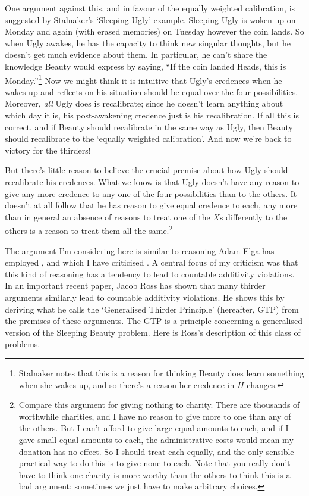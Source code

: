 One argument against this, and in favour of the equally weighted calibration, is suggested by Stalnaker's `Sleeping Ugly' example. Sleeping Ugly is woken up on Monday and again (with erased memories) on Tuesday however the coin lands. So when Ugly awakes, he has the capacity to think new singular thoughts, but he doesn't get much evidence about them. In particular, he can't share the knowledge Beauty would express by saying, ``If the coin landed Heads, this is Monday.''\footnote{Stalnaker notes that this is a reason for thinking Beauty does learn something when she wakes up, and so there's a reason her credence in \(H\) changes.} Now we might think it is intuitive that Ugly's credences when he wakes up and reflects on his situation should be equal over the four possibilities. Moreover, \textit{all} Ugly does is recalibrate; since he doesn't learn anything about which day it is, his post-awakening credence just is his recalibration. If all this is correct, and if Beauty should recalibrate in the same way as Ugly, then Beauty should recalibrate to the `equally weighted calibration'. And now we're back to victory for the thirders!

But there's little reason to believe the crucial premise about how Ugly should recalibrate his credences. What we know is that Ugly doesn't have any reason to give any more credence to any one of the four possibilities than to the others. It doesn't at all follow that he has reason to give equal credence to each, any more than in general an absence of reasons to treat one of the \(X\)s differently to the others is a reason to treat them all the same.\footnote{Compare this argument for giving nothing to charity. There are thousands of worthwhile charities, and I have no reason to give more to one than any of the others. But I can't afford to give large equal amounts to each, and if I gave small equal amounts to each, the administrative costs would mean my donation has no effect. So I should treat each equally, and the only sensible practical way to do this is to give none to each. Note that you really don't have to think one charity is more worthy than the others to think this is a bad argument; sometimes we just have to make arbitrary choices.}

The argument I'm considering here is similar to reasoning Adam Elga has employed \citet{Elga2004}, and which I have criticised \citet{Weatherson2005-WEACWD}. A central focus of my criticism was that this kind of reasoning has a tendency to lead to countable additivity violations. In an important recent paper, Jacob Ross \citeyearpar{Ross2010} has shown that many thirder arguments similarly lead to countable additivity violations. He shows this by deriving what he calls the `Generalised Thirder Principle' (hereafter, GTP) from the premises of these arguments. The GTP is a principle concerning a generalised version of the Sleeping Beauty problem. Here is Ross's description of this class of problems.


